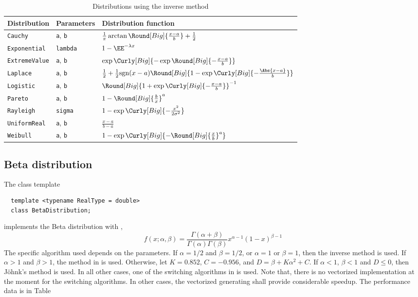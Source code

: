 \begin{table}
  \begin{tabularx}{\textwidth}{llL}
    \toprule
    Distribution & Parameters & Distribution function \\
    \midrule
    \verb|Cauchy| & \verb|a|, \verb|b|
    & $\frac{1}{\pi}\arctan\Round[Big]{\frac{x - a}{b}} + \frac{1}{2}$ \\
    \verb|Exponential| & \verb|lambda|
    & $1 - \EE^{-\lambda x}$ \\
    \verb|ExtremeValue| &\verb|a|, \verb|b|
    & $\exp\Curly[Big]{-\exp\Round[Big]{-\frac{x - a}{b}}}$ \\
    \verb|Laplace| & \verb|a|, \verb|b|
    & $\frac{1}{2} + \frac{1}{2}\mathrm{sgn}(x - a)\Round[Big]{1 -
      \exp\Curly[Big]{-\frac{\Abs{x - a}}{b}}}$ \\
    \verb|Logistic| & \verb|a|, \verb|b|
    & $\Round[Big]{1 + \exp\Curly[Big]{-\frac{x - a}{b}}}^{-1}$ \\
    \verb|Pareto| & \verb|a|, \verb|b|
    & $1 - \Round[Big]{\frac{b}{x}}^a$ \\
    \verb|Rayleigh| & \verb|sigma|
    & $1 - \exp\Curly[Big]{-\frac{x^2}{2\sigma^2}}$ \\
    \verb|UniformReal| & \verb|a|, \verb|b|
    & $\frac{x - a}{b - a}$ \\
    \verb|Weibull| & \verb|a|, \verb|b|
    & $1 - \exp\Curly[Big]{-\Round[Big]{\frac{x}{b}}^a}$ \\
    \bottomrule
  \end{tabularx}
  \caption{Distributions using the inverse method}
  \label{tab:Distributions using the inverse method}
\end{table}

\subsection{Beta distribution}
\label{sub:Beta distribution}

The class template
\begin{Verbatim}
  template <typename RealType = double>
  class BetaDistribution;
\end{Verbatim}
implements the Beta distribution with \pdf,
\begin{equation*}
  f(x;\alpha,\beta) =
  \frac{\Gamma(\alpha + \beta)}{\Gamma(\alpha)\Gamma(\beta)}
  x^{\alpha - 1}(1 - x)^{\beta - 1}
\end{equation*}
The specific algorithm used depends on the parameters. If $\alpha = 1/2$ and
$\beta = 1/2$, or $\alpha = 1$ or $\beta = 1$, then the inverse method is used.
If $\alpha > 1$ and $\beta > 1$, the method in \textcite{Cheng:1978jl} is used.
Otherwise, let $K = 0.852$, $C = -0.956$, and $D = \beta + K\alpha^2 + C$. If
$\alpha < 1$, $\beta < 1$ and $D \le 0$, then Jöhnk's method
\parencite[sec.~3.5]{Devroye:1986gi} is used. In all other cases, one of the
switching algorithms in \textcite{Atkinson:1979es} is used. Note that, there is
no vectorized implementation at the moment for the switching algorithms. In
other cases, the vectorized generating shall provide considerable speedup. The
performance data is in Table~

